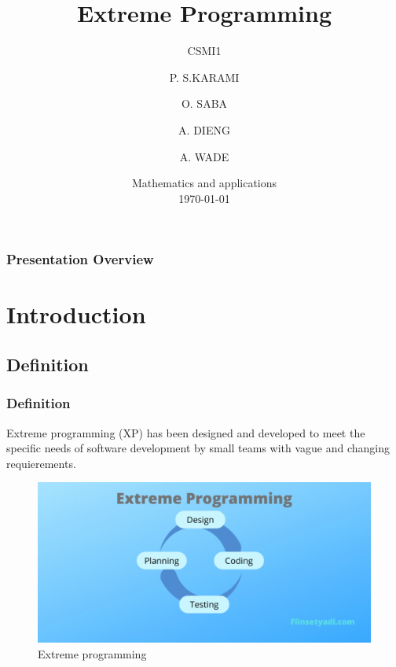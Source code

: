 \documentclass[
	11pt, 
]{beamer}
\title{Extreme Programming}
\subtitle{CSMI1}
\author[S.KARAMI \and SABA \and DIENG \and WADE]{P. S.KARAMI \and O. SABA \and A. DIENG \and A. WADE}
\institute[]{University of Strasbourg \\ \smallskip} %
\date[\today]{Mathematics and applications \\ \today} %
\begin{document}

\begin{frame}
	\titlepage %
\end{frame}


\begin{frame}
	\frametitle{Presentation Overview} %
	
	\tableofcontents 
\end{frame}


\section{Introduction}


\subsection{Definition}

\begin{frame}
	\frametitle{Definition}
	
	Extreme programming (XP) has been designed and developed to meet the specific needs of software development by small teams with vague and changing requierements.	
	\bigskip %
	\begin{figure}
		\includegraphics[width=0.8\linewidth]{ext2.pdf}
		\caption{Extreme programming\cite{p1}}
	\end{figure}

\end{frame}
\end{document}
